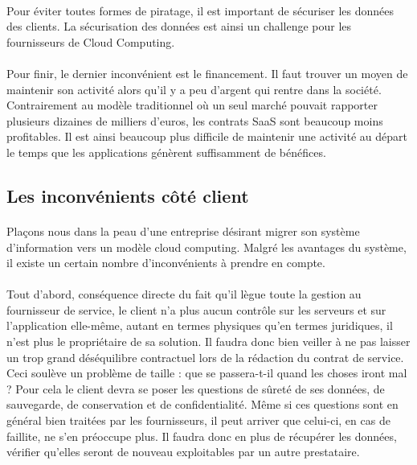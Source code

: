 \documentclass[a4paper,12pt]{report}
\begin{document}
\begin{onehalfspace}
	\paragraph*{}
	Pour éviter toutes formes de piratage, il est important de sécuriser les données des clients. La sécurisation des données est ainsi un challenge pour les fournisseurs de Cloud Computing. 
	
	\paragraph*{}
	Pour finir, le dernier inconvénient est le financement. Il faut trouver un moyen de maintenir son activité alors qu'il y a peu d'argent qui rentre dans la société. Contrairement au modèle traditionnel où un seul marché pouvait rapporter plusieurs dizaines de milliers d'euros, les contrats SaaS sont beaucoup moins profitables. Il est ainsi beaucoup plus difficile de maintenir une activité au départ le temps que les applications génèrent suffisamment de bénéfices.	
	
	\subsection{Les inconvénients côté client}
	
	\paragraph*{}	
	Plaçons nous dans la peau d'une entreprise désirant migrer son système d'information vers un modèle cloud computing. Malgré les avantages du système, il existe un certain nombre d'inconvénients à prendre en compte.
	
	\paragraph*{}
	Tout d’abord, conséquence directe du fait qu’il lègue toute la gestion au fournisseur de service, le client n’a plus aucun contrôle sur les serveurs et sur l’application elle-même, autant en termes physiques qu’en termes juridiques, il n’est plus le propriétaire de sa solution. Il faudra donc bien veiller à ne pas laisser un trop grand déséquilibre contractuel lors de la rédaction du contrat de service.
Ceci soulève un problème de taille : que se passera-t-il quand les choses iront mal ? Pour cela le client devra se poser les questions de sûreté de ses données, de sauvegarde, de conservation et de confidentialité. Même si ces questions sont en général bien traitées par les fournisseurs, il peut arriver que celui-ci, en cas de faillite, ne s’en préoccupe plus. Il faudra donc en plus de récupérer les données, vérifier qu’elles seront de nouveau exploitables par un autre prestataire.


\end{onehalfspace}
\end{document}
